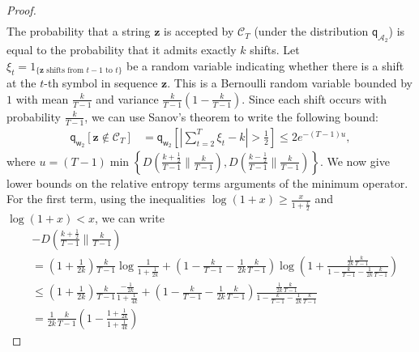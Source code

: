 \documentclass{article}
\newcommand{\sA}{\mathscr A}
\newcommand{\sC}{\mathscr C}
\newcommand{\bz}{{\mathbf z}}
\newcommand{\sfq}{{\mathsf q}}
\newcommand{\sfw}{{\mathsf w}}
\newcommand{\ignore}[1]{}
\begin{document}
\begin{proof}
\begin{align*}
  \end{align*}
  The probability that a string $\bz$ is accepted by $\sC_T$ (under the
  distribution $\sfq_{\sA_2}$) is equal to the probability that it
  admits exactly $k$ shifts. Let $\xi_t = 1_{\{\text{$\bz$ shifts from
      $t-1$ to $t$}\}}$ be a random variable indicating whether there
  is a shift at the $t$-th symbol in sequence $\bz$. This is a Bernoulli
  random variable bounded by $1$ with mean $\frac{k}{T-1}$ and
  variance $\frac{k}{T-1} ( 1- \frac{k}{T-1})$.  Since each shift
  occurs with probability $\frac{k}{T-1}$, we can use Sanov's theorem
to write the following bound:
  \begin{align*}
    \sfq_{\sfw_2}[\bz \notin \sC_T]
    & = \sfq_{\sfw_2}\left[ \left| \sum_{t=2}^T \xi_t - k \right| > \frac{1}{2} \right] 
    \leq 2 e^{-(T-1) u}, 
  \end{align*}
  where
  $u = (T-1) \displaystyle\min\left\{ D\left(\frac{k +
        \frac{1}{2}}{T-1} \bigg \| \frac{k}{T-1}\right),
    D\left(\frac{k - \frac{1}{2}}{T-1} \bigg \| \frac{k}{T-1}\right)
  \right\}$.  We now give lower bounds on the relative entropy terms
  arguments of the minimum operator.  For the first term, using the
  inequalities $\log(1 + x) \geq \frac{x}{1 + \frac{x}{2}}$ and
  $\log(1 + x) < x$, we can write
\begin{align*}
    & - D\left(\frac{k + \frac{1}{2}}{T-1} \bigg\| \frac{k}{T-1}\right) \\ 
\ignore{
    & = - D\left(\frac{k}{T-1}\left(1 + \frac{1}{2k}\right) \bigg \| \frac{k}{T-1}\right) \\
    & = \bigg(1 + \frac{1}{2k} \bigg) \frac{k}{T-1} \log
      \frac{\frac{k}{T-1}}{\left(1 + \frac{1}{2k}
      \right)\frac{k}{T-1}} + \left(1 - \left(1 + \frac{1}{2k} \right)
      \frac{k}{T-1}\right) \log \frac{1 - \frac{k}{T-1}}{1 - \left(1 +
      \frac{1}{2k} \right) \frac{k}{T-1}} \\
}
    & = \left(1 + \frac{1}{2k} \right) \frac{k}{T-1} \log \frac{1}{1 + \frac{1}{2k} } + \left( 1 - \frac{k}{T-1} - \frac{1}{2k} \frac{k}{T-1}\right) \log\left(1 + \frac{\frac{1}{2k} \frac{k}{T-1}}{1 - \frac{k}{T-1} - \frac{1}{2k} \frac{k}{T-1}} \right) \\
    & \leq \left(1 + \frac{1}{2k} \right) \frac{k}{T-1} \frac{-\frac{1}{2k}}{1 + \frac{1}{4k}} + \left( 1 - \frac{k}{T-1} - \frac{1}{2k} \frac{k}{T-1} \right) \frac{\frac{1}{2k} \frac{k}{T-1}}{1 - \frac{k}{T-1} - \frac{1}{2k} \frac{k}{T-1}} \\
    & = \frac{1}{2k} \frac{k}{T-1} \left( 1 - \frac{ 1 + \frac{1}{2k} }{1 + \frac{1}{4k}} \right) 

\end{align*}
\end{proof}
\end{document}
